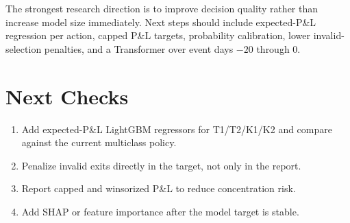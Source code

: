 \documentclass[11pt]{article}
\begin{document}
The strongest research direction is to improve decision quality rather than increase model size
immediately. Next steps should include expected-P\&L regression per action, capped P\&L targets,
probability calibration, lower invalid-selection penalties, and a Transformer over event days
\(-20\) through 0.

\section{Next Checks}

\begin{enumerate}
\item Add expected-P\&L LightGBM regressors for T1/T2/K1/K2 and compare against the current multiclass policy.
\item Penalize invalid exits directly in the target, not only in the report.
\item Report capped and winsorized P\&L to reduce concentration risk.
\item Add SHAP or feature importance after the model target is stable.
\end{enumerate}
\end{document}
